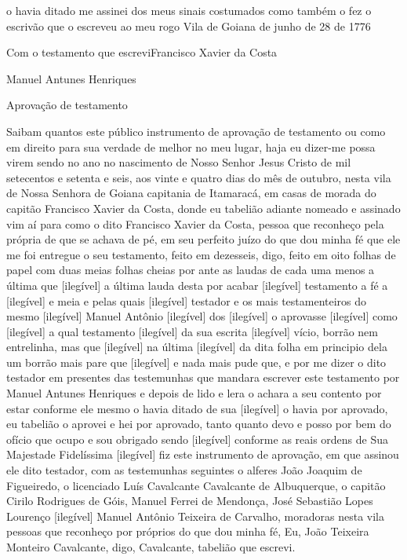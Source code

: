 \begin{refsection}
o havia ditado me assinei dos meus sinais costumados como também o fez o escrivão que o escreveu ao meu rogo Vila de Goiana de junho de 28 de 1776 

    \vspace{1em}

    \noindent{}Com o testamento que escrevi\tabto{45ex}Francisco Xavier da Costa
    
    \noindent{}Manuel Antunes Henriques

    \vspace{10mm}

    \noindent{}Aprovação de testamento

    \vspace{1em}

    \noindent{}Saibam quantos este público instrumento de aprovação de testamento ou como em direito para sua verdade de melhor no meu lugar, haja eu dizer-me possa virem sendo no ano no nascimento de Nosso Senhor Jesus Cristo de mil setecentos e setenta e seis, aos vinte e quatro dias do mês de outubro, nesta vila de Nossa Senhora de Goiana capitania de Itamaracá, em casas de morada do capitão Francisco Xavier da Costa, donde eu tabelião adiante nomeado e assinado vim aí para como o dito Francisco Xavier da Costa, pessoa que reconheço pela própria de que se achava de pé, em seu perfeito juízo do que dou minha fé que ele me foi entregue o seu testamento, feito em dezesseis, digo, feito em oito folhas de papel com duas meias folhas cheias por ante as laudas de cada uma menos a última que [ilegível] a última lauda desta por acabar [ilegível] testamento a fé a  [ilegível] e meia e pelas quais [ilegível] testador e os mais testamenteiros do mesmo [ilegível] Manuel Antônio [ilegível] dos [ilegível] o aprovasse [ilegível] como [ilegível] a qual testamento [ilegível] da sua escrita [ilegível] vício, borrão nem entrelinha, mas que [ilegível] na última [ilegível] da dita folha em principio dela um borrão mais pare que [ilegível] e nada mais pude que, e por me dizer o dito testador em presentes das testemunhas que mandara escrever este testamento por Manuel Antunes Henriques e depois de lido e lera o achara a seu contento por estar conforme ele mesmo o havia ditado de sua [ilegível] o havia por aprovado, eu tabelião o aprovei e hei por aprovado, tanto quanto devo e posso por bem do ofício que ocupo e sou obrigado sendo [ilegível] conforme as reais ordens de Sua Majestade Fidelíssima [ilegível] fiz este instrumento de aprovação, em que assinou ele dito testador, com as testemunhas seguintes o alferes João Joaquim de Figueiredo, o licenciado Luís Cavalcante Cavalcante de Albuquerque, o capitão Cirilo Rodrigues de Góis, Manuel Ferrei de Mendonça, José Sebastião Lopes Lourenço [ilegível] Manuel Antônio Teixeira de Carvalho, moradoras nesta vila pessoas que reconheço por próprios do que dou minha fé, Eu, João Teixeira Monteiro Cavalcante, digo, Cavalcante, tabelião que escrevi.


\end{refsection}
